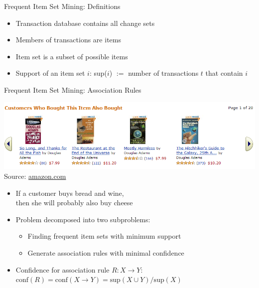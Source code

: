 \begin{frame}{Frequent Item Set Mining: Definitions}
  \begin{itemize}
  \item \alert{Transaction database} contains all change sets
  \item Members of transactions are \alert{items}
  \item \alert{Item set} is a subset of possible items
  \item \alert{Support} of an item set $i$: sup($i$) $:=$ number of
    transactions $t$ that contain $i$
  \end{itemize}
\end{frame}


\begin{frame}{Frequent Item Set Mining: Association Rules}
  \begin{center}
    \includegraphics[width=\textwidth]{figures/frequent-items} \\
    \tiny{Source: \url{amazon.com}}
  \end{center}


  \begin{itemize}
  \item \alert{If} a customer buys \alert{bread} and \alert{wine}, \\
    \alert{then} she will probably also buy \alert{cheese}
  \item Problem decomposed into two subproblems:
    \begin{itemize}
    \item Finding frequent item sets with minimum support
    \item Generate association rules with minimal confidence
    \end{itemize}
  \item Confidence for association rule $R: X \rightarrow Y$:
    $\text{conf}(R) = \text{conf}(X \rightarrow Y) =
    \text{sup}(X \cup Y)/\text{sup}(X)$
  \end{itemize}
\end{frame}

